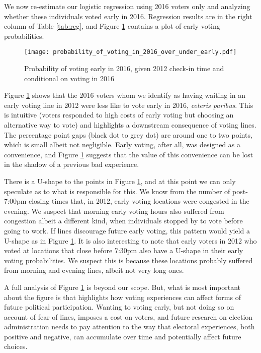 \documentclass[12pt,titlepage]{article}
\begin{document}
We now re-estimate our logistic regression using 2016 voters only and
analyzing whether these individuals voted early in 2016.  Regression
results are in the right column of Table \ref{tab:reg}, and Figure
\ref{fig:prvotingearly2016} contains a plot of early voting
probabilities.

\begin{figure}[!ht]
\caption{Probability of voting early in 2016, given 2012 check-in time
and conditional on voting in 2016}
  \label{fig:prvotingearly2016}
  \centering
    \centering\texttt{[image: probability\_of\_voting\_in\_2016\_over\_under\_early.pdf]}
\end{figure}

Figure \ref{fig:prvotingearly2016} shows that the 2016 voters whom we
identify as having waiting in an early voting line in 2012 were less
like to vote early in 2016, \emph{ceteris paribus}.  This is intuitive
(voters responded to high costs of early voting but choosing an
alternative way to vote) and highlights a downstream consequence of
voting lines.  The percentage point gaps (black dot to grey dot) are
around one to two points, which is small albeit not negligible.  Early
voting, after all, was designed as a convenience, and Figure
\ref{fig:prvotingearly2016} suggests that the value of this
convenience can be lost in the shadow of a previous bad experience.

There is a U-shape to the points in Figure
\ref{fig:prvotingearly2016}, and at this point we can only speculate
as to what is responsible for this.  We know from the number of
post-7:00pm closing times that, in 2012, early voting locations were
congested in the evening.  We suspect that morning early voting hours
also suffered from congestion albeit a different kind, when
individuals stopped by to vote before going to work.  If lines
discourage future early voting, this pattern would yield a U-shape as
in Figure \ref{fig:prvotingearly2016}.  It is also interesting to note
that early voters in 2012 who voted at locations that close before
7:30pm also have a U-shape in their early voting probabilities.  We
suspect this is because these locations probably suffered from morning
and evening lines, albeit not very long ones.

A full analysis of Figure \ref{fig:prvotingearly2016} is beyond our
scope.  But, what is most important about the figure is that
highlights how voting experiences can affect forms of future political
participation.  Wanting to voting early, but not doing so on account
of fear of lines, imposes a cost on voters, and future research on
election administration needs to pay attention to the way that
electoral experiences, both positive and negative, can accumulate over
time and potentially affect future choices.
\end{document}
